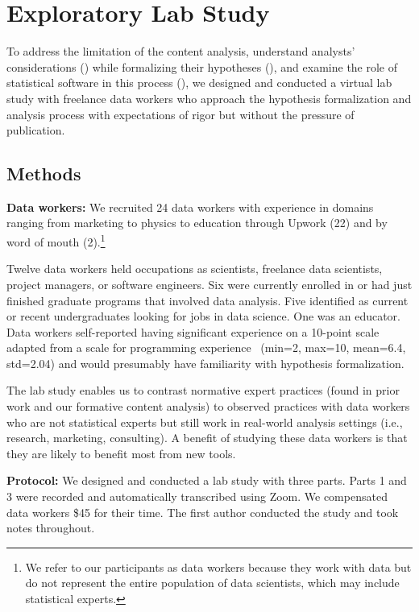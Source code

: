 \section{Exploratory Lab Study} \label{sec:labStudyHypoForm}

To address the limitation of the content analysis, understand analysts'
considerations (\rqProcess) while formalizing their hypotheses (\rqSteps), and
examine the role of statistical software in this process (\rqTools), we designed
and conducted a virtual lab study with freelance data workers who approach the
hypothesis formalization and analysis process with expectations of rigor but
without the pressure of publication.

\subsection{Methods} 
\textbf{Data workers:} We recruited 24 data workers with experience in domains
ranging from marketing to physics to education through Upwork (22) and by
word of mouth (2).\footnote{We refer to our participants as data workers because they work with data but do not represent the entire population of data scientists, which may include statistical experts.}

Twelve data workers held occupations as scientists, freelance data scientists,
project managers, or software engineers. Six were currently enrolled in or had just
finished graduate programs that involved data analysis. Five identified as
current or recent undergraduates looking for jobs in data science. One was an
educator. Data workers self-reported having significant experience on a 10-point
scale adapted from a scale for programming experience~\cite{feigenspan2012measuring} (min=2, max=10, mean=6.4,
std=2.04) and would presumably have familiarity with hypothesis formalization.

The lab study enables us to contrast normative expert practices (found in 
prior work and our formative content analysis) to observed practices with data
workers who are not statistical experts but still work in real-world analysis
settings (i.e., research, marketing, consulting). A benefit of studying these
data workers is that they are likely to benefit most from new tools. 


\noindent\textbf{Protocol:} %
We designed
and conducted a lab study with three parts. Parts 1 and 3 were recorded and automatically transcribed using Zoom. We compensated data workers \$45 for
their time. The first author conducted the study and took notes throughout.

